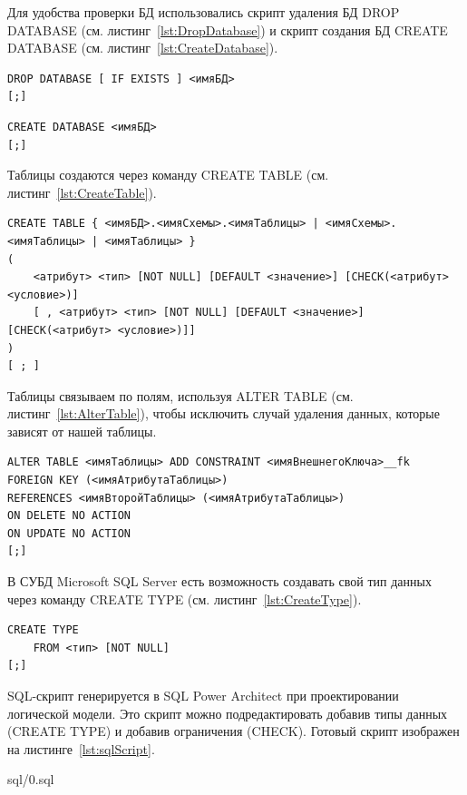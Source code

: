 Для удобства проверки БД использовались скрипт удаления БД DROP DATABASE \cite{MssqlDropDatabase} (см. листинг~\ref{lst:DropDatabase})
и скрипт создания БД CREATE DATABASE \cite{MssqlCreateDatabase} (см. листинг~\ref{lst:CreateDatabase}).

\begin{lstlisting}[caption={Удаление базы данных\label{lst:DropDatabase}}]
DROP DATABASE [ IF EXISTS ] <имяБД>
[;]
\end{lstlisting}

\begin{lstlisting}[caption={Создание базы данных\label{lst:CreateDatabase}}]
CREATE DATABASE <имяБД>
[;]
\end{lstlisting}

Таблицы создаются через команду CREATE TABLE \cite{MssqlCreateTable} (см. листинг~\ref{lst:CreateTable}).

\begin{lstlisting}[caption={Создание таблицы\label{lst:CreateTable}}]
CREATE TABLE { <имяБД>.<имяСхемы>.<имяТаблицы> | <имяСхемы>.<имяТаблицы> | <имяТаблицы> }
(
    <атрибут> <тип> [NOT NULL] [DEFAULT <значение>] [CHECK(<атрибут> <условие>)]
    [ , <атрибут> <тип> [NOT NULL] [DEFAULT <значение>] [CHECK(<атрибут> <условие>)]]
)
[ ; ]
\end{lstlisting}

Таблицы связываем по полям, используя ALTER TABLE \cite{MssqlAlterTable} (см. листинг~\ref{lst:AlterTable}), чтобы исключить случай удаления данных, которые зависят от нашей таблицы.

\begin{lstlisting}[caption={Связываем таблицы по полям\label{lst:AlterTable}}]
ALTER TABLE <имяТаблицы> ADD CONSTRAINT <имяВнешнегоКлюча>__fk
FOREIGN KEY (<имяАтрибутаТаблицы>)
REFERENCES <имяВторойТаблицы> (<имяАтрибутаТаблицы>)
ON DELETE NO ACTION
ON UPDATE NO ACTION
[;]
\end{lstlisting}

В СУБД Microsoft SQL Server есть возможность создавать свой тип данных через команду CREATE TYPE \cite{MssqlCreateType} (см. листинг~\ref{lst:CreateType}).

\begin{lstlisting}[caption={Связываем таблицы по полям\label{lst:CreateType}}]
CREATE TYPE
    FROM <тип> [NOT NULL]
[;]
\end{lstlisting}

SQL-скрипт генерируется в SQL Power Architect \cite{SqlPowerArhitect} при проектировании логической модели.
Это скрипт можно подредактировать добавив типы данных (CREATE TYPE) и добавив ограничения (CHECK).
Готовый скрипт изображен на листинге~\ref{lst:sqlScript}.


{sql/0.sql}

\newpage
